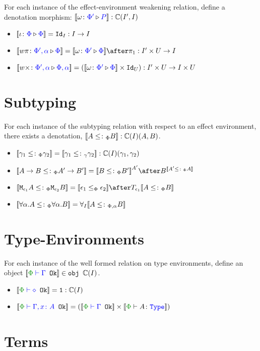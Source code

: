 \documentclass{report}
\begin{document}
For each instance of the effect-environment weakening relation, define a denotation morphism: ${\bf [\![}\omega \colon {\color{blue}\Phi'} \triangleright {\color {blue} P}{\bf ]\!]}: \mathbb{C}(I', I)$

\begin{itemize}
    \item ${\bf [\![}\iota \colon {\color{blue}\Phi} \triangleright {\color {blue} \Phi}{\bf ]\!]} = \texttt{Id}_{I}: I \rightarrow I$
    \item $\deno{\wrel{w\pi}{\P',\a}{\P}} = \deno{\wrelw{\P'}{\P}}\after \p: I'\times U\rightarrow I$
    \item ${\bf [\![}w\times \colon {\color{blue}\Phi',\alpha} \triangleright {\color {blue} \Phi,\alpha}{\bf ]\!]} = ({\bf [\![}\omega \colon {\color{blue}\Phi'} \triangleright {\color {blue} \Phi}{\bf ]\!]}\times \texttt{Id}_{U}): I'\times U\rightarrow I\times U$
\end{itemize}

\section{Subtyping}

For each instance of the subtyping relation with respect  to an effect environment, there exists a denotation, ${\bf [\![}A\leq\colon_\Phi B{\bf ]\!]}: \mathbb{C}(I)(A, B)$.

\begin{itemize}
    \item ${\bf [\![}\gamma_1\leq\colon_\Phi \gamma_2{\bf ]\!]} = {\bf [\![}\gamma_1\leq\colon_\gamma \gamma_2{\bf ]\!]} : \mathbb{C}(I)(\gamma_1, \gamma_2)$
    \item $\deno{\ab \subtypep \fntype{A'}{B'}} = \deno{B\subtypep B'}^{A'}\after B^{\deno{A'\subtypep A}}$
    \item $\deno{\M{\e_1}{A}\subtypep\M{\e_2}{B}} = \deno{\e_1\subeffectp\e_2}\after\T{\e_1}{\deno{A\subtypep B}}$
    \item ${\bf [\![}\forall \alpha. A\leq\colon_\Phi\forall \alpha. B{\bf ]\!]} = \forall_I{{\bf [\![}A\leq\colon_{\Phi, \alpha} B{\bf ]\!]}}$
\end{itemize}

\section{Type-Environments}
For each instance of the well formed relation on type environments, define an object $\deno{\wellformedok{\P}{\G}}\in\obj\C(I)$.

\begin{itemize}
    \item $\deno{\wellformedok{\P}{\nil}} = \1: \C(I)$
    \item $\deno{\wellformedok{\P}{\gax}} = (\deno{\wellformedok{\P}{\G}} \times \deno{\typerelation{\P}{A}{\type}})$
\end{itemize}

\section{Terms}
\end{document}
